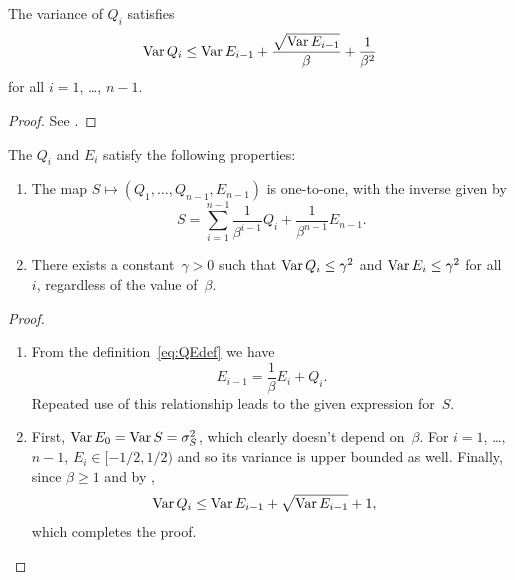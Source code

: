 \begin{lemma}
  \label{lem:Qvarbound}
  The variance of $Q_i$ satisfies
  \begin{equation*}
    \operatorname{Var} Q_i \le \operatorname{Var} E_{i-1} + \frac{\sqrt{\operatorname{Var} E_{i-1}}}{\beta} +
    \frac{1}{\beta^2}
  \end{equation*}
  for all $i = 1$, \dots, $n-1$. 
\end{lemma}

\begin{proof}
  See .
\end{proof}



\begin{proposition}
  \label{prop:qeproperties}
  The $Q_i$ and $E_i$ satisfy the following properties:
\begin{enumerate}
  \item The map $S \mapsto (Q_1, \dots, Q_{n-1}, E_{n-1})$ is one-to-one, with
    the inverse given by
    \begin{equation}
      \label{eq:unwraprec}
      S = \sum_{i=1}^{n-1} \frac{1}{\beta^{i-1}} Q_i + \frac{1}{\beta^{n-1}}
      E_{n-1}.
    \end{equation}

  \item There exists a constant~$\gamma > 0$ such that $\operatorname{Var} Q_i \le \gamma^2$
    and $\operatorname{Var} E_i \le \gamma^2$ for all~$i$, regardless of the value of~$\beta$.
\end{enumerate}
\end{proposition}

\goodbreak
\begin{proof}
  \begin{enumerate}
    \item From the definition~\eqref{eq:QEdef} we have
    \begin{equation}
      \label{eq:reverserec}
      E_{i-1} = \frac{1}{\beta} E_i + Q_i.
    \end{equation}
    Repeated use of this relationship leads to the given expression for~$S$. 

  \item First, $\operatorname{Var} E_0 = \operatorname{Var} S = {\sigma_S^2}$, which clearly doesn't depend
    on~$\beta$. For $i = 1$, \ldots, $n-1$, $E_i \in [-1/2, 1/2)$ and so its
    variance is upper bounded as well. Finally, since $\beta \ge 1$ and by
    , 
    \begin{align*}
      \operatorname{Var} Q_i &\le \operatorname{Var} E_{i-1} + \sqrt{\operatorname{Var} E_{i-1}} + 1,
    \end{align*}
    which completes the proof.
  \end{enumerate}
\end{proof}

